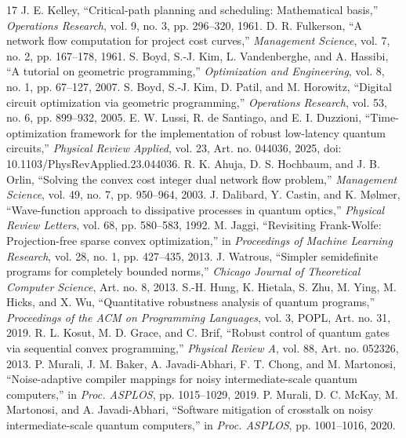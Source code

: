 \documentclass[10pt,letterpaper,journal]{IEEEtran}
\begin{document}
\begin{thebibliography}{17}
 J. E. Kelley, ``Critical-path planning and scheduling: Mathematical basis,'' \emph{Operations Research}, vol. 9, no. 3, pp. 296--320, 1961.
 D. R. Fulkerson, ``A network flow computation for project cost curves,'' \emph{Management Science}, vol. 7, no. 2, pp. 167--178, 1961.
 S. Boyd, S.-J. Kim, L. Vandenberghe, and A. Hassibi, ``A tutorial on geometric programming,'' \emph{Optimization and Engineering}, vol. 8, no. 1, pp. 67--127, 2007.
 S. Boyd, S.-J. Kim, D. Patil, and M. Horowitz, ``Digital circuit optimization via geometric programming,'' \emph{Operations Research}, vol. 53, no. 6, pp. 899--932, 2005.
 E. W. Lussi, R. de Santiago, and E. I. Duzzioni, ``Time-optimization framework for the implementation of robust low-latency quantum circuits,'' \emph{Physical Review Applied}, vol. 23, Art. no. 044036, 2025, doi: 10.1103/PhysRevApplied.23.044036.
 R. K. Ahuja, D. S. Hochbaum, and J. B. Orlin, ``Solving the convex cost integer dual network flow problem,'' \emph{Management Science}, vol. 49, no. 7, pp. 950--964, 2003.
 J. Dalibard, Y. Castin, and K. M\o lmer, ``Wave-function approach to dissipative processes in quantum optics,'' \emph{Physical Review Letters}, vol. 68, pp. 580--583, 1992.
 M. Jaggi, ``Revisiting Frank-Wolfe: Projection-free sparse convex optimization,'' in \emph{Proceedings of Machine Learning Research}, vol. 28, no. 1, pp. 427--435, 2013.
 J. Watrous, ``Simpler semidefinite programs for completely bounded norms,'' \emph{Chicago Journal of Theoretical Computer Science}, Art. no. 8, 2013.
 S.-H. Hung, K. Hietala, S. Zhu, M. Ying, M. Hicks, and X. Wu, ``Quantitative robustness analysis of quantum programs,'' \emph{Proceedings of the ACM on Programming Languages}, vol. 3, POPL, Art. no. 31, 2019.
 R. L. Kosut, M. D. Grace, and C. Brif, ``Robust control of quantum gates via sequential convex programming,'' \emph{Physical Review A}, vol. 88, Art. no. 052326, 2013.
 P. Murali, J. M. Baker, A. Javadi-Abhari, F. T. Chong, and M. Martonosi, ``Noise-adaptive compiler mappings for noisy intermediate-scale quantum computers,'' in \emph{Proc. ASPLOS}, pp. 1015--1029, 2019.
 P. Murali, D. C. McKay, M. Martonosi, and A. Javadi-Abhari, ``Software mitigation of crosstalk on noisy intermediate-scale quantum computers,'' in \emph{Proc. ASPLOS}, pp. 1001--1016, 2020.

\end{thebibliography}
\end{document}
